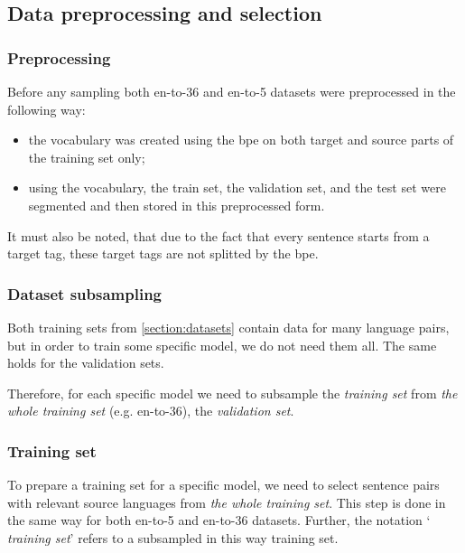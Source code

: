 \subsection{{Data preprocessing and selection}}
\label{section:data_selection}
\label{section:data_preprocessing}

\subsubsection*{Preprocessing}
	Before any sampling both en-to-36 and en-to-5 datasets
were preprocessed  in the following way:
\begin{itemize}
	\item the vocabulary was created using the \acrshort{bpe}
		on both target and source parts of the training set only;
	\item using the vocabulary, the train set, the validation
		set, and the test set were segmented and then stored
		in this preprocessed form.
\end{itemize}

It must also be noted, that due to the fact that every sentence starts from a
target tag, these target tags are not splitted by the \acrshort{bpe}.

\subsubsection*{Dataset subsampling}

Both training sets from \cref{section:datasets} contain data for
many language pairs, but in order to train some specific model,
we do not need them all.
The same holds for the validation sets.

Therefore, for each specific model 
we need to subsample the \emph{ training set}
from \emph{the whole training set} (e.g. \gls{en-to-36}),
the \emph{ validation set}.



\subsubsection*{Training set}

To prepare a training set for a specific model, we need to select
sentence pairs with relevant source languages from
\emph{the whole training set}.
This step is done in the same way for both \gls{en-to-5} and \gls{en-to-36}
datasets.
Further, the notation `\emph{ training set}'
refers to a subsampled in this way training set.

